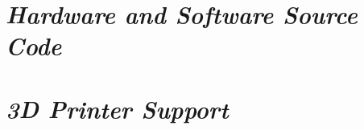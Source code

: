 \documentclass[twoside,12pt,openright,final,english]{memoir}
\newif\ifmaintenance\maintenancefalse %
\newif\iffaq\faqfalse %
\newif\iftroubleshooting\troubleshootingfalse %
\newif\ifsource\sourcetrue %
\newif\ifsupport\supporttrue %
\begin{document}
\ifmaintenance
\chapter{\emph{Maintaining Your 3D Printer}}
\thispagestyle{empty}
\markboth{Maintaining Your 3D Printer}{LulzBot\textsuperscript{\miniscule{\texttrademark}} Mini User Manual}
{}
\fi

\ifmaintenance
\chapter{\emph{Advanced Usage}}
\thispagestyle{empty}
\markboth{Advanced Usage}{LulzBot\textsuperscript{\miniscule{\texttrademark}} Mini User Manual}
{}
\fi

\iffaq
\chapter{\emph{FAQ}}
\thispagestyle{empty}
\markboth{FAQ}{LulzBot\textsuperscript{\miniscule{\texttrademark}} Mini User Manual}
{}
\fi

\iftroubleshooting
\chapter{\emph{Troubleshooting}}
\thispagestyle{empty}
\markboth{Troubleshooting}{LulzBot\textsuperscript{\miniscule{\texttrademark}} Mini User Manual}
{}
\fi

\ifsource
\chapter{\emph{Hardware and Software Source Code}}
\thispagestyle{empty}
{}
\fi

\ifsupport
\chapter{\emph{3D Printer Support}}
\thispagestyle{empty}
{}
\fi
\end{document}
